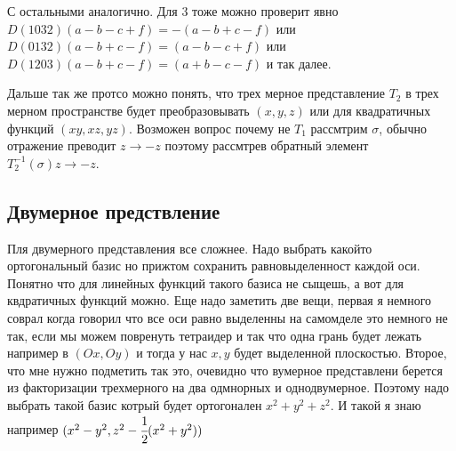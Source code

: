 С остальными аналогично. Для 3 тоже можно проверит явно $D(1032) (a - b - c + f) = -(a - b + c - f) $ или 
$D(0132)(a - b + c - f) = (a - b - c + f)$ или $D(1203)(a - b + c - f) = (a + b - c - f)$ и так далее.

Дальше так же протсо можно понять, что трех мерное представление $T_2$ в трех мерном 
пространстве будет преобразовывать $(x, y, z)$ или для квадратичных функций
$(xy, xz, yz)$. Возможен вопрос почему не $T_1$ рассмтрим $\sigma$, обычно 
отражение преводит $z \to -z$ поэтому рассмтрев обратный элемент $T_2^{-1}(\sigma) z \to -z$.

\subsection{Двумерное предствление}

Пля двумерного представления все сложнее. Надо выбрать какойто ортогональный 
базис но прижтом сохранить равновыделенност каждой оси. Понятно что для линейных
функций такого базиса не сыщешь, а вот для квдратичных функций можно. Еще 
надо заметить две вещи, первая я немного соврал когда говорил что все оси
равно выделенны на самомделе это немного не так, если мы можем повренуть тетраидер
и так что одна грань будет лежать например в $(Ox, Oy)$ и тогда у нас $x, y$
будет выделенной плоскостью. Второе, что мне нужно подметить так это, очевидно
что вумерное представлени берется из факторизации трехмерного на два одмнорных
и однодвумерное. Поэтому надо выбрать такой базис котрый будет ортогонален
$x^2 + y^2 + z^2$. И такой я знаю например $(x^2 - y^2, z^2 - \cfrac{1}{2} (x^2 + y^2))$ 



